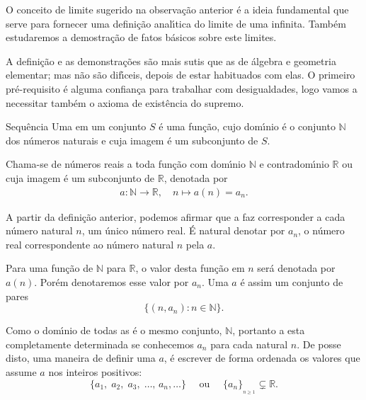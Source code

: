 O conceito de limite sugerido na observa\c{c}\~{a}o anterior \'{e} a ideia
fundamental que serve para fornecer uma defini\c{c}\~{a}o anal\'{\i}tica do
limite de uma \seq infinita. Tamb\'{e}m estudaremos a demostra\c{c}\~{a}o de
fatos b\'{a}sicos sobre este limites.

A defini\c{c}\~{a}o e as demonstra\c{c}\~{o}es s\~{a}o mais sutis que as de \'{a}lgebra e
geometria elementar; mas n\~{a}o s\~{a}o dif\'{\i}ceis, depois de estar
habituados com elas. O primeiro pr\'{e}-requisito \'{e} alguma confian\c{c}a
para trabalhar com desigualdades, logo vamos a necessitar tamb\'{e}m  o
axioma de exist\^{e}ncia do supremo.

\begin{defic}{Sequência}{}
Uma \seq em um conjunto $S$ \'{e} uma fun\c{c}\~{a}o, cujo dom\'{\i}nio \'{e} o conjunto $\mathbb{N}$
dos n\'{u}meros naturais e cuja imagem \'{e} um subconjunto de $S$.
\end{defic}

Chama-se \seq de n\'{u}meros reais a toda fun\c{c}\~{a}o com dom\'{\i}nio $\mathbb{N}$ e contradom\'{\i}nio $\mathbb{R}$ ou cuja imagem \'{e} um subconjunto de $\mathbb{R}$, denotada por
\begin{align*}
 a\colon \mathbb{N}\to \mathbb{R},\quad n\mapsto a(n)=a_n.
\end{align*}

A partir da defini\c{c}\~{a}o anterior, podemos afirmar que a \seq faz corresponder a cada n\'{u}mero natural $n$, um \'{u}nico n\'{u}mero real. \'{E} natural denotar por $a_n$, o n\'{u}mero real correspondente ao n\'{u}mero natural $n$ pela \seq $a$.

Para uma fun\c{c}\~{a}o \seq de $\mathbb{N}$ para $\mathbb{R}$, o valor desta fun\c{c}\~{a}o em $n$  ser\'{a} denotada por $a(n)$. Por\'{e}m denotaremos esse valor por $a_n$. Uma \seq $a$ \'{e} assim um conjunto de pares
\begin{equation*}
    \{(n, a_n) \colon n\in \mathbb{N}\}.
\end{equation*}

Como o dom\'{\i}nio  de todas as \seqs \'{e} o mesmo conjunto, $\mathbb{N}$, portanto a \seq esta completamente determinada se conhecemos $a_n$ para cada natural $n$. De posse disto, uma maneira de definir uma \seq $a$, \'{e} escrever de forma ordenada os valores que assume $a$ nos inteiros positivos:
\begin{equation*}
 \{ a_1,\;a_2,\; a_3,\; \ldots,\,a_n,\ldots\}\quad \text{ ou }\quad \{a_n\}_{_{n\geq 1}}\subsetneq \mathbb{R}.
\end{equation*}

